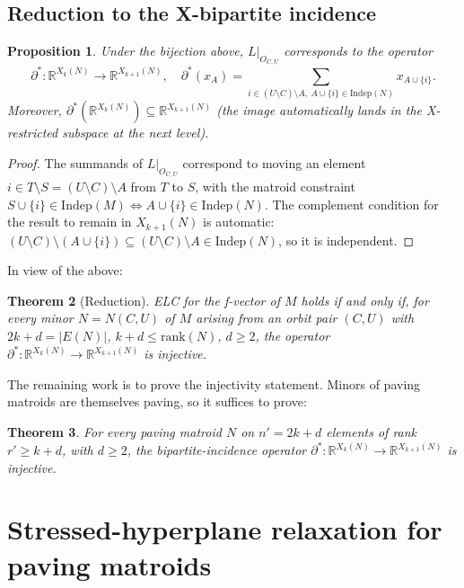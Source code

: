 \documentclass[11pt]{article}
\newtheorem{theorem}{Theorem}
\newtheorem{proposition}[theorem]{Proposition}
\theoremstyle{definition}
\newcommand{\Indep}{\mathrm{Indep}}
\newcommand{\rank}{\mathrm{rank}}
\begin{document}
\subsection{Reduction to the X-bipartite incidence}

\begin{proposition}
Under the bijection above, $L|_{O_{C, U}}$ corresponds to the operator
\[ \partial^* : \mathbb{R}^{X_k(N)} \to \mathbb{R}^{X_{k+1}(N)}, \quad \partial^*(x_A) = \sum_{i \in (U \setminus C) \setminus A,\ A \cup \{i\} \in \Indep(N)} x_{A \cup \{i\}}. \]
Moreover, $\partial^*(\mathbb{R}^{X_k(N)}) \subseteq \mathbb{R}^{X_{k+1}(N)}$ (the image automatically lands in the X-restricted subspace at the next level).
\end{proposition}

\begin{proof}
The summands of $L|_{O_{C, U}}$ correspond to moving an element $i \in T \setminus S = (U \setminus C) \setminus A$ from $T$ to $S$, with the matroid constraint $S \cup \{i\} \in \Indep(M) \Leftrightarrow A \cup \{i\} \in \Indep(N)$. The complement condition for the result to remain in $X_{k+1}(N)$ is automatic: $(U \setminus C) \setminus (A \cup \{i\}) \subseteq (U \setminus C) \setminus A \in \Indep(N)$, so it is independent.
\end{proof}

In view of the above:

\begin{theorem}[Reduction]
ELC for the f-vector of $M$ holds if and only if, for every minor $N = N(C, U)$ of $M$ arising from an orbit pair $(C, U)$ with $2k + d = |E(N)|$, $k + d \leq \rank(N)$, $d \geq 2$, the operator $\partial^* : \mathbb{R}^{X_k(N)} \to \mathbb{R}^{X_{k+1}(N)}$ is injective.
\end{theorem}

The remaining work is to prove the injectivity statement. Minors of paving matroids are themselves paving, so it suffices to prove:

\begin{theorem}
For every paving matroid $N$ on $n' = 2k + d$ elements of rank $r' \geq k + d$, with $d \geq 2$, the bipartite-incidence operator $\partial^* : \mathbb{R}^{X_k(N)} \to \mathbb{R}^{X_{k+1}(N)}$ is injective.
\end{theorem}

\section{Stressed-hyperplane relaxation for paving matroids}
\end{document}
